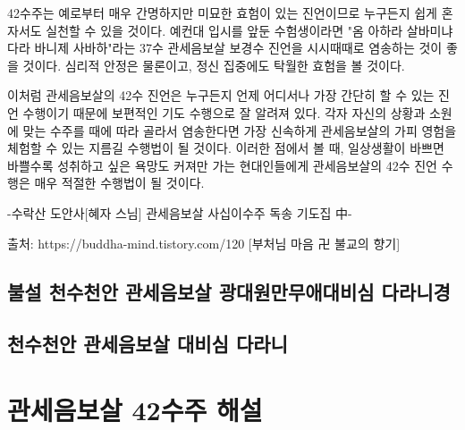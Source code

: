 \documentclass[12pt, a4paper, oneside]{book}
\let\stdsection\section
\renewcommand\section{\newpage\stdsection}
\begin{document}
 42수주는 예로부터 매우 간명하지만 미묘한 효험이 있는 진언이므로 누구든지 쉽게 혼자서도 실천할 수 있을 것이다.
 예컨대 입시를 앞둔 수험생이라면 "옴 아하라 살바미냐 다라 바니제 사바하"라는 37수 관세음보살 보경수 진언을 시시때때로 염송하는 것이 좋을 것이다.
 심리적 안정은 물론이고, 정신 집중에도 탁월한 효험을 볼 것이다.

 이처럼 관세음보살의 42수 진언은 누구든지 언제 어디서나 가장 간단히 할 수 있는 진언 수행이기 때문에 보편적인 기도 수행으로 잘 알려져 있다.
 각자 자신의 상황과 소원에 맞는 수주를 때에 따라 골라서 염송한다면 가장 신속하게 관세음보살의 가피 영험을 체험할 수 있는 지름길 수행법이 될 것이다.
 이러한 점에서 볼 때, 일상생활이 바쁘면 바쁠수록 성취하고 싶은 욕망도 커져만 가는 현대인들에게 관세음보살의 42수 진언 수행은 매우 적절한 수행법이 될 것이다.

                 -수락산 도안사[혜자 스님] 관세음보살 사십이수주 독송 기도집 中-





출처: https://buddha-mind.tistory.com/120 [부처님 마음 卍 불교의 향기]



	\section{ 불설 천수천안 관세음보살 광대원만무애대비심 다라니경 }



	\section{ 천수천안 관세음보살 대비심 다라니 }



	\chapter{관세음보살 42수주 해설 }


		\newpage
		\minitoc				%
\end{document}
